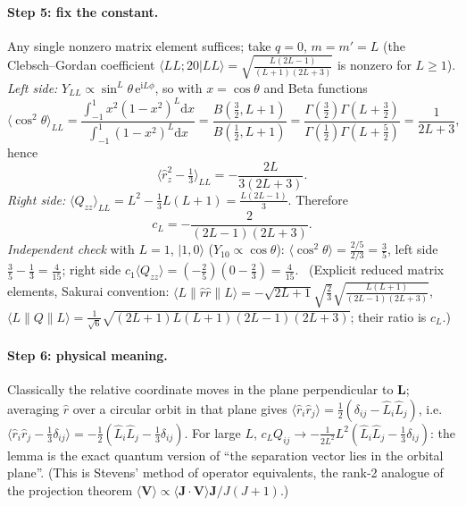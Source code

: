 \documentclass[11pt,a4paper]{article}
\numberwithin{equation}{section}
\theoremstyle{definition}
\theoremstyle{plain}
\theoremstyle{remark}
\numberwithin{algorithm}{section}
\newcommand{\vL}{\bm L}
\newcommand{\vJ}{\bm J}
\newcommand{\dd}{\mathrm{d}}
\newcommand{\ii}{\mathrm{i}}
\newcommand{\ee}{\mathrm{e}}
\newcommand{\ket}[1]{|#1\rangle}
\begin{document}
\paragraph{Step 5: fix the constant.} Any single nonzero matrix element suffices; take $q=0$, $m=m'=L$ (the Clebsch--Gordan coefficient $\langle LL;20|LL\rangle=\sqrt{\frac{L(2L-1)}{(L+1)(2L+3)}}$ is nonzero for $L\ge1$).
\emph{Left side:} $Y_{LL}\propto\sin^L\theta\,\ee^{\ii L\phi}$, so with $x=\cos\theta$ and Beta functions
\begin{equation*}
\langle\cos^2\theta\rangle_{LL}=\frac{\int_{-1}^1x^2(1-x^2)^L\dd x}{\int_{-1}^1(1-x^2)^L\dd x}=\frac{B(\frac32,L+1)}{B(\frac12,L+1)}=\frac{\Gamma(\frac32)\Gamma(L+\frac32)}{\Gamma(\frac12)\Gamma(L+\frac52)}=\frac{1}{2L+3},
\end{equation*}
hence
\begin{equation*}
\Big\langle\hat r_z^2-\tfrac13\Big\rangle_{LL}=-\frac{2L}{3(2L+3)} .
\end{equation*}
\emph{Right side:} $\langle Q_{zz}\rangle_{LL}=L^2-\frac13L(L+1)=\frac{L(2L-1)}3$. Therefore
\begin{equation}
c_L=-\frac{2}{(2L-1)(2L+3)} .
\end{equation}
\emph{Independent check} with $L=1$, $\ket{1,0}$ ($Y_{10}\propto\cos\theta$): $\langle\cos^2\theta\rangle=\frac{2/5}{2/3}=\frac35$, left side $\frac35-\frac13=\frac4{15}$; right side $c_1\langle Q_{zz}\rangle=(-\frac25)(0-\frac23)=\frac4{15}$. \checkmark\ (Explicit reduced matrix elements, Sakurai convention: $\langle L\|\hat r\hat r\|L\rangle=-\sqrt{2L+1}\sqrt{\tfrac23}\sqrt{\frac{L(L+1)}{(2L-1)(2L+3)}}$, $\langle L\|Q\|L\rangle=\frac1{\sqrt6}\sqrt{(2L+1)L(L+1)(2L-1)(2L+3)}$; their ratio is $c_L$.)

\paragraph{Step 6: physical meaning.} Classically the relative coordinate moves in the plane perpendicular to $\vL$; averaging $\hat r$ over a circular orbit in that plane gives $\langle\hat r_i\hat r_j\rangle=\frac12(\delta_{ij}-\hat L_i\hat L_j)$, i.e.\ $\langle\hat r_i\hat r_j-\frac13\delta_{ij}\rangle=-\frac12(\hat L_i\hat L_j-\frac13\delta_{ij})$. For large $L$, $c_LQ_{ij}\to-\frac1{2L^2}L^2(\hat L_i\hat L_j-\frac13\delta_{ij})$: the lemma is the exact quantum version of ``the separation vector lies in the orbital plane''. (This is Stevens' method of operator equivalents, the rank-2 analogue of the projection theorem $\langle\bm V\rangle\propto\langle\vJ\cdot\bm V\rangle\vJ/J(J+1)$.)
\end{document}
